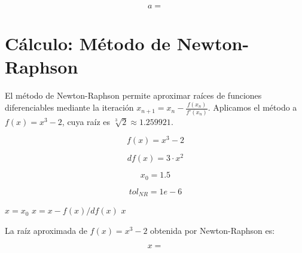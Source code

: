 \documentclass{article}
\begin{document}
\begin{equation}
    a = 
    \label{eq:res:a}
\end{equation}



\section{Cálculo: Método de Newton-Raphson}

El método de Newton-Raphson permite aproximar raíces de funciones diferenciables
mediante la iteración $x_{n+1} = x_n - \frac{f(x_n)}{f'(x_n)}$.
Aplicamos el método a $f(x) = x^3 - 2$, cuya raíz es $\sqrt[3]{2} \approx 1.259921$.

\begin{equation}
    f(x) = x^3 - 2
    \label{eq:calc:f}
\end{equation}

\begin{equation}
    df(x) = 3 \cdot x^2
    \label{eq:calc:df}
\end{equation}

\begin{equation}
    x_0 = 1.5
    \label{eq:calc:x0}
\end{equation}

\begin{equation}
    tol_{NR} = 1e-6
    \label{eq:calc:tolNR}
\end{equation}

\begin{algorithm}
\caption{Método de Newton-Raphson para $f(x) = x^3 - 2$}
\begin{algorithmic}
    \STATE $x = x_0$
        \STATE $x = x - f(x) / df(x)$
    \ENDWHILE
    \RETURN $x$
\end{algorithmic}
\end{algorithm}

La raíz aproximada de $f(x) = x^3 - 2$ obtenida por Newton-Raphson es:

\begin{equation}
    x =
    \label{eq:res:x}
\end{equation}

\end{document}

